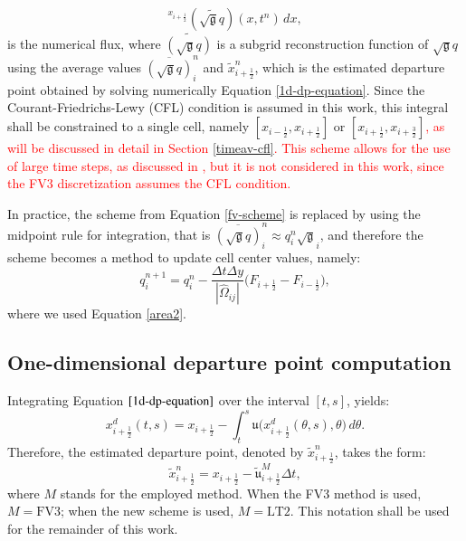 \documentclass[preprint,12pt]{elsarticle}
\begin{document}
\begin{linenumbers}
\begin{equation}
	 ^{x_{i+\frac{1}{2}}}
	 (\widetilde{\sqrt{\mathfrak{g}}{q}})(x, t^n) \,dx,
\end{equation} 
is the numerical flux, where $\widetilde{(\sqrt{\mathfrak{g}}{q})}$ is a subgrid reconstruction function of $\sqrt{\mathfrak{g}}{q}$ using the average values $\overline{(\sqrt{\mathfrak{g}}q)}^{n}_{i}$ and $\tilde{x}_{i+\frac{1}{2}}^n$, which is the estimated departure point obtained by solving numerically Equation \eqref{1d-dp-equation}.
Since the Courant-Friedrichs-Lewy (CFL) condition is assumed in this work, this integral shall be constrained to a single cell, namely $[x_{i-\frac{1}{2}},x_{i+\frac{1}{2}}]$ or $[x_{i+\frac{1}{2}},x_{i+\frac{3}{2}}]$\textcolor{red}{, as will be discussed in detail in Section \ref{timeav-cfl}.
This scheme allows for the use of large time steps, as discussed in \cite{lin:1996,chen:2017}, but it is not considered in this work, since the FV3 discretization assumes the CFL condition.}

In practice, the scheme from Equation \eqref{fv-scheme} is replaced by using the midpoint rule for integration, that is $\overline{(\sqrt{\mathfrak{g}}q)}_{i}^n \approx q_{i}^n\sqrt{\mathfrak{g}}_{i}$, and therefore the scheme becomes a method to update cell center values, namely:
\begin{equation}
	\label{fv-scheme-mdp}
	{q}^{n+1}_{i} = {q}^{n}_{i} - \frac{\Delta t \Delta y}{|\hat{\Omega}_{ij}|}
	\bigg({F}_{i+\frac{1}{2}}-
	{F}_{i-\frac{1}{2}}\bigg),
\end{equation}
where we used Equation \eqref{area2}.

\subsection{One-dimensional departure point computation}
Integrating Equation $\eqref{1d-dp-equation}$ over the interval $[t,s]$, yields:
\begin{equation}
	\label{dp-integral}
	x_{i+\frac{1}{2}}^d(t,s) = x_{i+\frac{1}{2}} - \int_{t}^{s}{\mathfrak{u}}\big( x_{i+\frac{1}{2}}^d(\theta,s), \theta\big) \,d\theta.
\end{equation}
Therefore, the estimated departure point, denoted by $\tilde{x}_{i+\frac{1}{2}}^n$, takes the form:
\begin{equation}
	\label{dp-estimated}
	\tilde{x}_{i+\frac{1}{2}}^n = x_{i+\frac{1}{2}} - {\tilde{\mathfrak{u}}}^{M}_{i+\frac{1}{2}}\Delta t,
\end{equation}
where $M$ stands for the employed method.
When the FV3 method is used, $M=\text{FV3}$; when the new scheme is used, $M=\text{LT2}$. This notation shall be used for the remainder of this work.


\end{linenumbers}
\end{document}
